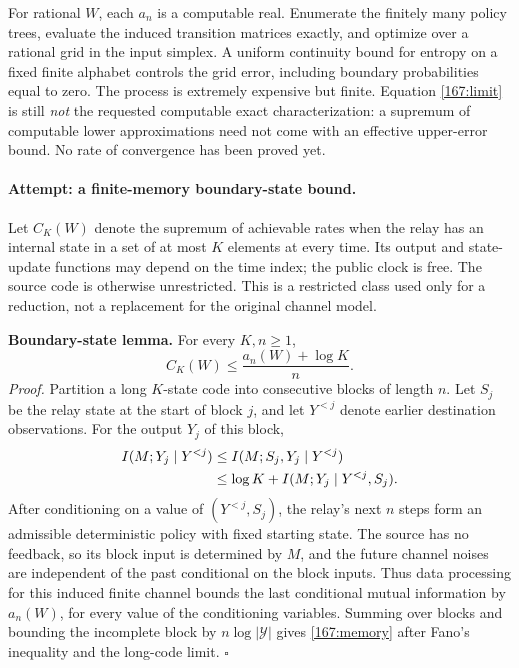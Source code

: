 \documentclass[11pt,a4paper]{article}
\numberwithin{equation}{section}
\begin{document}
For rational $W$, each $a_n$ is a computable real. Enumerate the finitely
many policy trees, evaluate the induced transition matrices exactly,
and optimize over a rational grid in the input simplex. A uniform
continuity bound for entropy on a fixed finite alphabet controls the
grid error, including boundary probabilities equal to zero. The process
is extremely expensive but finite. Equation \eqref{167:limit} is still
\emph{not} the requested computable exact characterization: a supremum
of computable lower approximations need not come with an effective
upper-error bound. No rate of convergence has been proved yet.

\paragraph{Attempt: a finite-memory boundary-state bound.}
Let $C_K(W)$ denote the supremum of achievable rates when the relay
has an internal state in a set of at most $K$ elements at every time.
Its output and state-update functions may depend on the time index;
the public clock is free. The source code is otherwise unrestricted.
This is a restricted class used only for a reduction, not a replacement
for the original channel model.

\textbf{Boundary-state lemma.} For every $K,n\geq1$,
\begin{equation}\label{167:memory}
 C_K(W)\leq\frac{a_n(W)+\log K}{n}.
\end{equation}
\emph{Proof.} Partition a long $K$-state code into consecutive blocks
of length $n$. Let $S_j$ be the relay state at the start of block $j$,
and let $Y^{<j}$ denote earlier destination observations. For the output
$Y_j$ of this block,
\begin{align}
 I(M;Y_j\mid Y^{<j})
 &\leq I(M;S_j,Y_j\mid Y^{<j})\notag\\
 &\leq\log K+I(M;Y_j\mid Y^{<j},S_j).
\end{align}
After conditioning on a value of $(Y^{<j},S_j)$, the relay's next $n$
steps form an admissible deterministic policy with fixed starting
state. The source has no feedback, so its block input is determined
by $M$, and the future channel noises are independent of the past
conditional on the block inputs. Thus data processing for this induced
finite channel bounds the last conditional mutual information by
$a_n(W)$, for every value of the conditioning variables. Summing over
blocks and bounding the incomplete block by $n\log|\mathcal Y|$ gives
\eqref{167:memory} after Fano's inequality and the long-code limit.
\hfill$\square$
\end{document}
